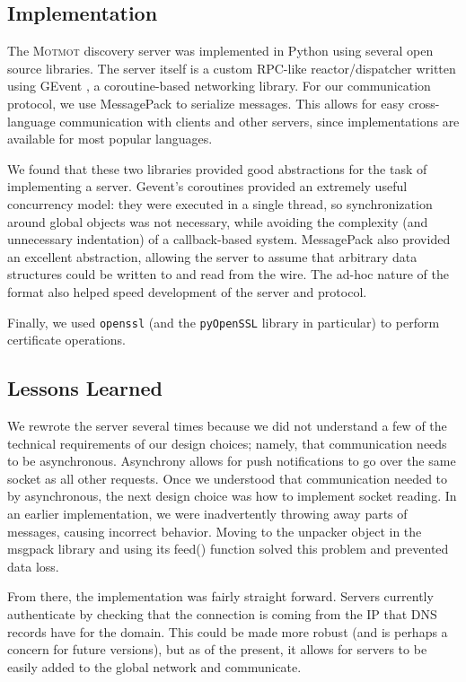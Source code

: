 \documentclass{sig-alternate}
\newcommand\Motmot{\textsc{Motmot}\xspace}
\begin{document}
\subsection{Implementation}

The \Motmot discovery server was implemented in Python using several open source
libraries. The server itself is a custom RPC-like reactor/dispatcher written
using GEvent \cite{glib}, a coroutine-based networking library. For our
communication protocol, we use MessagePack \cite{msgpack} to serialize messages.
This allows for easy cross-language communication with clients and other servers,
since implementations are available for most popular languages.

We found that these two libraries provided good abstractions for the task of
implementing a server. Gevent's coroutines provided an extremely useful
concurrency model: they were executed in a single thread, so synchronization
around global objects was not necessary, while avoiding the complexity (and
unnecessary indentation) of a callback-based system. MessagePack also provided
an excellent abstraction, allowing the server to assume that arbitrary data
structures could be written to and read from the wire. The ad-hoc nature of the
format also helped speed development of the server and protocol.

Finally, we used \texttt{openssl} (and the \texttt{pyOpenSSL} library in
particular) to perform certificate operations.

\subsection{Lessons Learned}

We rewrote the server several times because we did not understand a few of the technical requirements of our design choices; namely, that communication needs to be asynchronous. Asynchrony allows for  push notifications to go over the same socket as all other requests. Once we understood that communication needed to by asynchronous, the next  design choice was how to implement socket reading. In an earlier implementation, we were inadvertently throwing away parts of messages, causing incorrect behavior. Moving to the unpacker object in the msgpack library and using its feed() function solved this problem and prevented data loss.

From there, the implementation was fairly straight forward. Servers currently authenticate by checking that the connection is coming from the IP that DNS records have for the domain. This could be made more robust (and is perhaps a concern for future versions), but as of the present, it allows for servers to be easily added to the global network and communicate.
\end{document}
